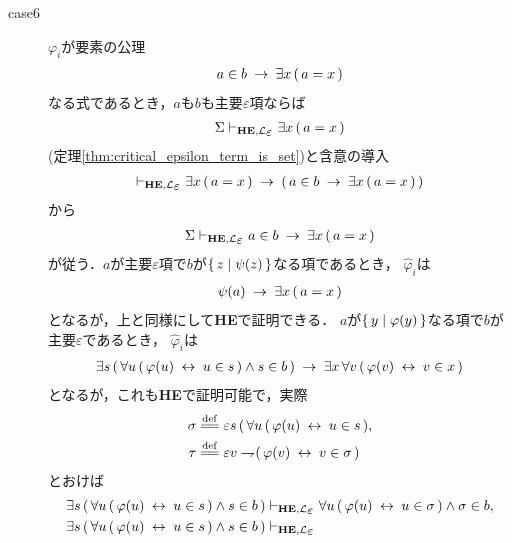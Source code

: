 \begin{metaprf}
\begin{description}
			\item[case6] $\varphi_{i}$が要素の公理
				\begin{align}
					a \in b \hspace{0.25em}\rightarrow\hspace{0.25em} \exists x\, (\, a = x\, )
				\end{align}
				なる式であるとき，$a$も$b$も主要$\varepsilon$項ならば
				\begin{align}
					\Sigma \provable{\mbox{{\bf HE}},\lang{\varepsilon}} \exists x\, (\, a = x\, )
				\end{align}
				(定理\ref{thm:critical_epsilon_term_is_set})と含意の導入
				\begin{align}
					\provable{\mbox{{\bf HE}},\lang{\varepsilon}} \exists x\, (\, a = x\, )
					\rarrow (\, a \in b \rarrow \exists x\, (\, a = x\, )\, )
				\end{align}
				から
				\begin{align}
					\Sigma \provable{\mbox{{\bf HE}},\lang{\varepsilon}} a \in b \rarrow \exists x\, (\, a = x\, )
				\end{align}
				が従う．$a$が主要$\varepsilon$項で$b$が$\{\, z \mid \psi(z)\, \}$なる項であるとき，
				$\widehat{\varphi}_{i}$は
				\begin{align}
					\psi(a) \hspace{0.25em}\rightarrow\hspace{0.25em} \exists x\, (\, a = x\, )
				\end{align}
				となるが，上と同様にして{\bf HE}で証明できる．
				$a$が$\{\, y \mid \varphi(y)\, \}$なる項で$b$が主要$\varepsilon$であるとき，
				$\widehat{\varphi}_{i}$は
				\begin{align}
					\exists s\, (\, \forall u\, (\, \varphi(u) \hspace{0.25em}\leftrightarrow\hspace{0.25em} u \in s\, )
					\wedge s \in b\, ) \hspace{0.25em}\rightarrow\hspace{0.25em} \exists x\, \forall v\, (\, \varphi(v) \hspace{0.25em}\leftrightarrow\hspace{0.25em} v \in x\, )
				\end{align}
				となるが，これも{\bf HE}で証明可能で，実際
				\begin{align}
					\sigma &\defeq \varepsilon s\, (\, \forall u\, (\, \varphi(u) \lrarrow u \in s\, ), \\
					\tau &\defeq \varepsilon v \negation (\, \varphi(v) \lrarrow v \in \sigma\, )
				\end{align}
				とおけば
				\begin{align}
					\exists s\, (\, \forall u\, (\, \varphi(u) \lrarrow u \in s\, )
					\wedge s \in b\, )
					&\provable{\mbox{{\bf HE}},\lang{\varepsilon}} 
					\forall u\, (\, \varphi(u) \lrarrow u \in \sigma\, )
					\wedge \sigma \in b, \\
					\exists s\, (\, \forall u\, (\, \varphi(u) \lrarrow u \in s\, )
					\wedge s \in b\, )
					&\provable{\mbox{{\bf HE}},\lang{\varepsilon}} 

\end{align}
\end{description}
\end{metaprf}
